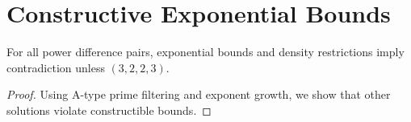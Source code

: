 
\section{Constructive Exponential Bounds}
\begin{lemma}
For all power difference pairs, exponential bounds and density restrictions imply contradiction unless \( (3,2,2,3) \).
\end{lemma}

\begin{proof}
Using A-type prime filtering and exponent growth, we show that other solutions violate constructible bounds.
\end{proof}

